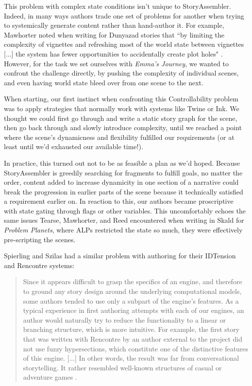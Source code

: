 This problem with complex state conditions isn't unique to StoryAssembler. Indeed, in many ways authors trade one set of problems for another when trying to systemically generate content rather than hand-author it. For example, Mawhorter noted when writing for Dunyazad stories that ``by limiting the complexity of vignettes and refreshing most of the world state between vignettes [...] the system has fewer opportunities to accidentally create plot holes" \cite{dunyazad}. However, for the task we set ourselves with \textit{Emma's Journey}, we wanted to confront the challenge directly, by pushing the complexity of individual scenes, and even having world state bleed over from one scene to the next.

When starting, our first instinct when confronting this Controllability problem was to apply strategies that normally work with systems like Twine or Ink. We thought we could first go through and write a static story graph for the scene, then go back through and slowly introduce complexity, until we reached a point where the scene's dynamicness and flexibility fulfilled our requirements (or at least until we'd exhausted our available time!).

In practice, this turned out not to be as feasible a plan as we'd hoped. Because StoryAssembler is greedily searching for fragments to fulfill goals, no matter the order, content added to increase dynamicity in one section of a narrative could break the progression in earlier parts of the scene because it technically satisfied a requirement earlier on. In reaction to this, our authors became proscriptive with state gating through flags or other variables. This uncomfortably echoes the same issues Tearse, Mawhorter, and Reed encountered when writing in Skald for \textit{Problem Planets}, where ALPs restricted the state so much, they were effectively pre-scripting the scenes.

Spierling and Szilas had a similar problem with authoring for their IDTension and Rencontre systems:

\begin{quote}
    Since it appears difficult to grasp the specifics of an engine, and therefore to ground any story design around the underlying computational models, some authors tended to use only a subpart of the engine's features. As a typical experience in first authoring
attempts with each of our engines, an author would naturally try to reduce the functionality to a linear or branching structure, which is more intuitive.
For example, the first story that was written with Rencontre by an author external to the project did not use fuzzy hypersections, which constitute one of the distinctive features of this engine. [...] In other words, the result was far from conversational storytelling. It rather resembled well-known structures of casual or adventure games \cite{authoring_issues}.
\end{quote}

